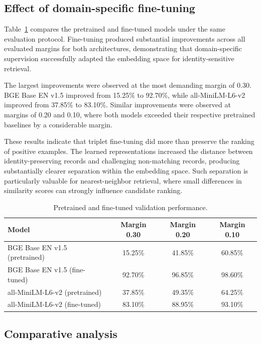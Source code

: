 \documentclass{article}
\begin{document}
\subsection{Effect of domain-specific fine-tuning}

Table~\ref{tab:finetuned} compares the pretrained and fine-tuned models under the same evaluation protocol. Fine-tuning produced substantial improvements across all evaluated margins for both architectures, demonstrating that domain-specific supervision successfully adapted the embedding space for identity-sensitive retrieval.

The largest improvements were observed at the most demanding margin of 0.30. BGE Base EN v1.5 improved from 15.25\% to 92.70\%, while all-MiniLM-L6-v2 improved from 37.85\% to 83.10\%. Similar improvements were observed at margins of 0.20 and 0.10, where both models exceeded their respective pretrained baselines by a considerable margin.

These results indicate that triplet fine-tuning did more than preserve the ranking of positive examples. The learned representations increased the distance between identity-preserving records and challenging non-matching records, producing substantially clearer separation within the embedding space. Such separation is particularly valuable for nearest-neighbor retrieval, where small differences in similarity scores can strongly influence candidate ranking.

\begin{table}[t]
  \caption{Pretrained and fine-tuned validation performance.}
  \label{tab:finetuned}
  \centering
  \begin{tabular}{lccc}
    \toprule
    Model & Margin 0.30 & Margin 0.20 & Margin 0.10 \\
    \midrule
    BGE Base EN v1.5 (pretrained) & 15.25\% & 41.85\% & 60.85\% \\
    BGE Base EN v1.5 (fine-tuned) & 92.70\% & 96.85\% & 98.60\% \\
    all-MiniLM-L6-v2 (pretrained) & 37.85\% & 49.35\% & 64.25\% \\
    all-MiniLM-L6-v2 (fine-tuned) & 83.10\% & 88.95\% & 93.10\% \\
    \bottomrule
  \end{tabular}
\end{table}

\subsection{Comparative analysis}
\end{document}
